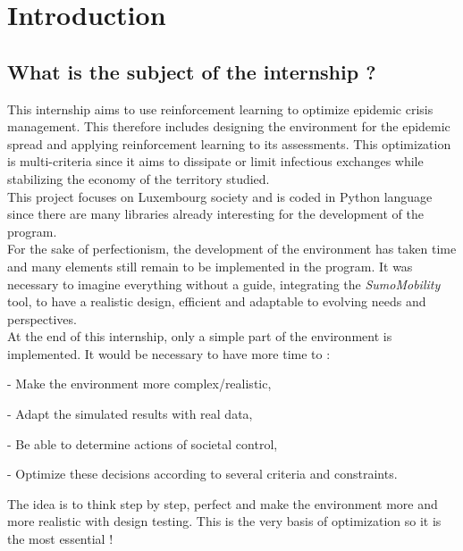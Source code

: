 \chapter*{Introduction}

\section*{What is the subject of the internship ?}

This internship aims to use reinforcement learning to optimize epidemic crisis management. This therefore includes designing the environment for the epidemic spread and applying reinforcement learning to its assessments. This optimization is multi-criteria since it aims to dissipate or limit infectious exchanges while stabilizing the economy of the territory studied.\\

This project focuses on Luxembourg society and is coded in Python language since there are many libraries already interesting for the development of the program.\\

For the sake of perfectionism, the development of the environment has taken time and many elements still remain to be implemented in the program. It was necessary to imagine everything without a guide, integrating the \textit{SumoMobility} tool, to have a realistic design, efficient and adaptable to evolving needs and perspectives.\\

At the end of this internship, only a simple part of the environment is implemented. It would be necessary to have more time to :
\begin{list}{}{}
\item - Make the environment more complex/realistic,
\item - Adapt the simulated results with real data, 
\item - Be able to determine actions of societal control,
\item - Optimize these decisions according to several criteria and constraints.\\
\end{list}

The idea is to think step by step, perfect and make the environment more and more realistic with design testing. This is the very basis of optimization so it is the most essential !

